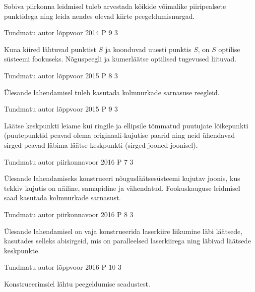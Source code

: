 \documentclass[11pt]{article}
\begin{document}
{{\ifHint
Sobiva piirkonna leidmisel tuleb arvestada kõikide võimalike piiripealsete punktidega ning leida nendes olevad kiirte peegeldumisnurgad.
\fi
}


{Tundmatu autor} %
{lõppvoor} %
{2014} %
{P 9} %
{3} %
{

\ifHint
Kuna kiired lähtuvad punktist $S$ ja koonduvad uuesti punktis $S$, on $S$ optilise süsteemi fookuseks. Nõguspeegli ja kumerläätse optilised tugevused liituvad.
\fi
}

{Tundmatu autor} %
{lõppvoor} %
{2015} %
{P 8} %
{3} %
{

\ifHint
Ülesande lahendamisel tuleb kasutada kolmnurkade sarnasuse reegleid.
\fi
}

{Tundmatu autor} %
{lõppvoor} %
{2015} %
{P 9} %
{3} %
{

\ifHint
Läätse keskpunkti leiame kui ringile ja ellipsile tõmmatud puutujate lõikepunkti (puutepunktid peavad olema originaali-kujutise paarid ning neid ühendavad sirged peavad läbima läätse keskpunkti (sirged jooned joonisel).
\fi
}


{Tundmatu autor} %
{piirkonnavoor} %
{2016} %
{P 7} %
{3} %
{

\ifHint
Ülesande lahendamiseks konstrueeri nõugusläätsesüsteemi kujutav joonis, kus tekkiv kujutis on näiline, samapidine ja vähendatud. Fookuskauguse leidmisel saad kasutada kolmnurkade sarnasust.
\fi
}

{Tundmatu autor} %
{piirkonnavoor} %
{2016} %
{P 8} %
{3} %
{

\ifHint
Ülesande lahendamisel on vaja konstrueerida laserkiire liikumine läbi läätsede, kasutades selleks abisirgeid, mis on paralleelsed laserkiirega ning läbivad läätsede keskpunkte.
\fi
}


{Tundmatu autor} %
{lõppvoor} %
{2016} %
{P 10} %
{3} %
{

\ifHint
Konstrueerimsiel lähtu peegeldumise seadustest.
\fi
}


}
\end{document}
